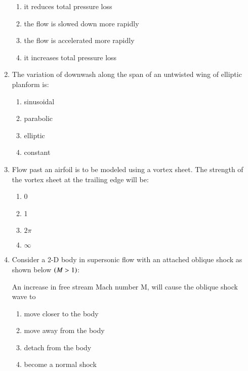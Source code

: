 \documentclass[journal]{IEEEtran}
\begin{document}
\begin{enumerate}[start=35]
\begin{enumerate}
    \item it reduces total pressure loss
    \item the flow is slowed down more rapidly
    \item the flow is accelerated more rapidly
    \item it increases total pressure loss
\end{enumerate}
\item The variation of downwash along the span of an untwisted wing of elliptic planform is:
\begin{enumerate}
    \item sinusoidal
    \item parabolic
    \item elliptic
    \item constant
\end{enumerate}
\item Flow past an airfoil is to be modeled using a vortex sheet. The strength of the vortex sheet at the trailing edge will be:
\begin{enumerate}
    \item 0
    \item 1
    \item $2\pi$
    \item $\infty$
\end{enumerate}
\item Consider a 2-D body in supersonic flow with an attached oblique shock as shown below $\left(M > 1\right)$:
\begin{figure}[!ht]
\centering
{}%

\label{fig:my_label}
\end{figure}
An increase in free stream Mach number M, will cause the oblique shock wave to
\begin{enumerate}
    \item move closer to the body
    \item move away from the body
    \item detach from the body
    \item become a normal shock
\end{enumerate}
\end{enumerate}
\end{document}
